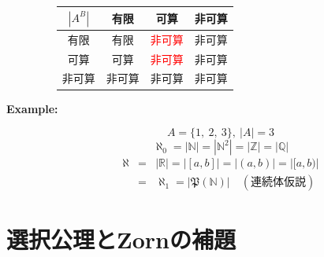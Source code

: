 \documentclass[english,dvipdfmx]{jsarticle}
\begin{document}
\begin{description}
\begin{enumerate}
                    \begin{table}[H]
                        \begin{center}
                        \begin{tabular}{|c|c|c|c|} \hline
                            $|A^B| $& 有限 & 可算 & 非可算 \\ \hline
                            有限 & 有限 &  \textcolor{red}{非可算} & 非可算 \\ \hline
                            可算 & 可算 & \textcolor{red}{非可算} & 非可算 \\ \hline
                            非可算 & 非可算 & 非可算 & 非可算 \\ \hline
                        \end{tabular}
                    \end{center}
                    \end{table}
            \end{enumerate}
        \item[\bf{Example:}]
            \begin{equation*}
                A = \{ 1,\ 2,\ 3 \} ,\ |A| = 3
            \end{equation*}
            \begin{equation*}
                \aleph_0 = | \mathbb{N} | = | \mathbb{N}^2| = | \mathbb{Z} | = | \mathbb{Q} |
            \end{equation*}
            \begin{eqnarray*}
                \aleph &=& | \mathbb{R} | = | [a,b] | = | (a,b) | = | [a,b) | \\
                &=& \aleph_1 = |\mathfrak{P}(\mathbb{N})| \quad ( 連続体仮説 )
            \end{eqnarray*}
    \end{description}

\section{選択公理とZornの補題}
\end{document}
